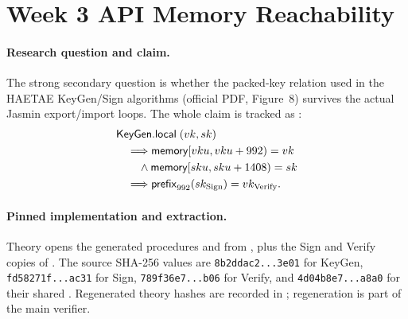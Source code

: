 \section{Week 3 API Memory Reachability}
\label{sec:week3-api-memory}

\paragraph{Research question and claim.}
The strong secondary question is whether the packed-key relation used in the
HAETAE KeyGen/Sign algorithms (official PDF, Figure~8) survives the actual
Jasmin export/import loops.  The whole claim is tracked as
:
\[
\begin{aligned}
  &\mathsf{KeyGen.local}\;(vk,sk) \\
  &\quad\Longrightarrow \mathsf{memory}[vku,vku+992)=vk \\
  &\qquad\land \mathsf{memory}[sku,sku+1408)=sk \\
  &\quad\Longrightarrow
    \mathsf{prefix}_{992}(sk_{\mathrm{Sign}})=vk_{\mathrm{Verify}}.
\end{aligned}
\]

\paragraph{Pinned implementation and extraction.}
Theory  opens the generated procedures
 and
 from , plus the
Sign and Verify copies of .  The source
SHA-256 values are \texttt{8b2ddac2...3e01} for KeyGen,
\texttt{fd58271f...ac31} for Sign, \texttt{789f36e7...b06} for Verify, and
\texttt{4d04b8e7...a8a0} for their shared .  Regenerated
theory hashes are recorded in
; regeneration is part of
the main verifier.

